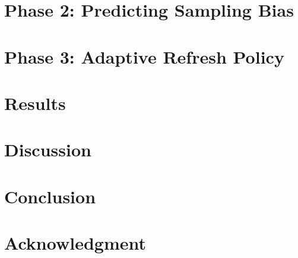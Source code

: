 \documentclass[conference]{IEEEtran}
\begin{document}
\section{Phase 2: Predicting Sampling Bias}

\section{Phase 3: Adaptive Refresh Policy}

\section{Results}

\section{Discussion}

\section{Conclusion}

\section*{Acknowledgment}
\end{document}

